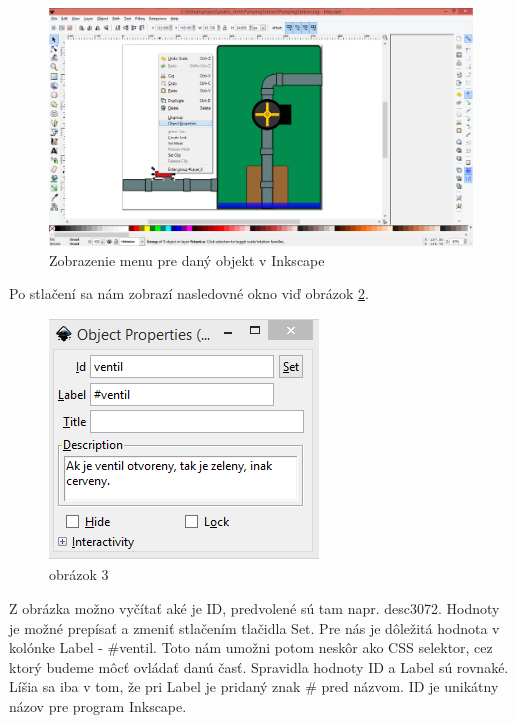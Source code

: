 \begin{figure}[ht]
	\begin{center}
		\includegraphics [width=15cm] {obrazky/obr2.png}
		\caption{Zobrazenie menu pre daný objekt v Inkscape}
		\label{picture2}
	\end{center}
\end{figure}

Po stlačení sa nám zobrazí nasledovné okno viď obrázok \ref{picture3}. 

\begin{figure}[ht]
	\begin{center}
		\includegraphics  {obrazky/obr3.png}
		\caption{obrázok 3}
		\label{picture3}
	\end{center}
\end{figure}


Z obrázka možno vyčítať aké je ID, predvolené sú tam napr. desc3072. Hodnoty je možné prepísať a zmeniť stlačením tlačidla Set. Pre nás je dôležitá hodnota v kolónke Label - \#ventil. Toto nám umožni potom neskôr ako CSS selektor, cez ktorý budeme môcť ovládať danú časť. Spravidla hodnoty ID a Label sú rovnaké. Líšia sa iba v tom, že pri Label je pridaný znak \# pred názvom. ID je unikátny názov pre program Inkscape. 

